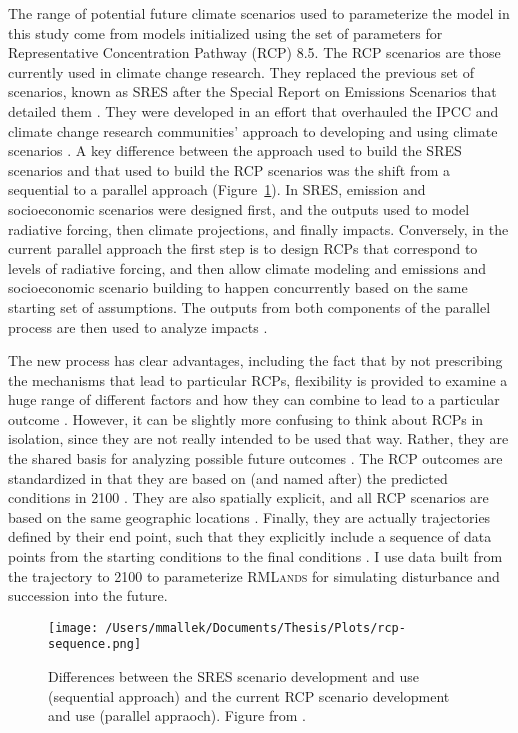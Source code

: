The range of potential future climate scenarios used to parameterize the model in this study come from models initialized using the set of parameters for Representative Concentration Pathway (RCP) 8.5. The RCP scenarios are those currently used in climate change research. They replaced the previous set of scenarios, known as SRES after the Special Report on Emissions Scenarios that detailed them \citep{VanVuuren2011a}. They were developed in an effort that overhauled the IPCC and climate change research communities' approach to developing and using climate scenarios \citep{Moss2008}. A key difference between the approach used to build the SRES scenarios and that used to build the RCP scenarios was the shift from a sequential to a parallel approach (Figure~\ref{fig:scenarioapproach}). In SRES, emission and socioeconomic scenarios were designed first, and the outputs used to model radiative forcing, then climate projections, and finally impacts. Conversely, in the current parallel approach the first step is to design RCPs that correspond to levels of radiative forcing, and then allow climate modeling and emissions and socioeconomic scenario building to happen concurrently based on the same starting set of assumptions. The outputs from both components of the parallel process are then used to analyze impacts \citep{Moss2010}. 

The new process has clear advantages, including the fact that by not prescribing the mechanisms that lead to particular RCPs, flexibility is provided to examine a huge range of different factors and how they can combine to lead to a particular outcome \citep{VanVuuren2011}. However, it can be slightly more confusing to think about RCPs in isolation, since they are not really intended to be used that way. Rather, they are the shared basis for analyzing possible future outcomes \citep{VanVuuren2011}. The RCP outcomes are standardized in that they are based on (and named after) the predicted conditions in 2100 \citep{VanVuuren2011a}. They are also spatially explicit, and all RCP scenarios are based on the same geographic locations \citep{VanVuuren2011a}. Finally, they are actually trajectories defined by their end point, such that they explicitly include a sequence of data points from the starting conditions to the final conditions \citep{VanVuuren2011}. I use data built from the trajectory to 2100 to parameterize \textsc{RMLands} for simulating disturbance and succession into the future.

\begin{figure}[!htbp]
\texttt{[image: /Users/mmallek/Documents/Thesis/Plots/rcp-sequence.png]}
\caption{Differences between the SRES scenario development and use (sequential approach) and the current RCP scenario development and use (parallel appraoch). Figure from \citet{Moss2008}.}
\label{fig:scenarioapproach}
\end{figure}


